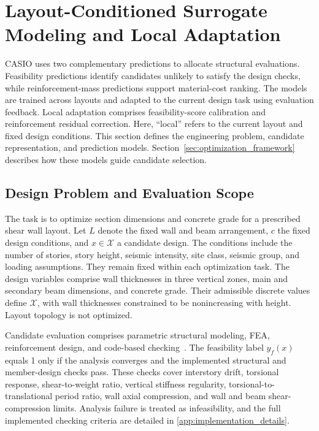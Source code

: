 \section{Layout-Conditioned Surrogate Modeling and Local Adaptation}
\label{sec:problem_surrogate}

CASIO uses two complementary predictions to allocate structural evaluations. Feasibility predictions identify candidates unlikely to satisfy the design checks, while reinforcement-mass predictions support material-cost ranking. The models are trained across layouts and adapted to the current design task using evaluation feedback. Local adaptation comprises feasibility-score calibration and reinforcement residual correction. Here, ``local'' refers to the current layout and fixed design conditions. This section defines the engineering problem, candidate representation, and prediction models. Section~\ref{sec:optimization_framework} describes how these models guide candidate selection.

\subsection{Design Problem and Evaluation Scope}
\label{subsec:expensive_problem}

The task is to optimize section dimensions and concrete grade for a prescribed shear wall layout. Let $L$ denote the fixed wall and beam arrangement, $c$ the fixed design conditions, and $x\in\mathcal{X}$ a candidate design. The conditions include the number of stories, story height, seismic intensity, site class, seismic group, and loading assumptions. They remain fixed within each optimization task. The design variables comprise wall thicknesses in three vertical zones, main and secondary beam dimensions, and concrete grade. Their admissible discrete values define $\mathcal{X}$, with wall thicknesses constrained to be nonincreasing with height. Layout topology is not optimized.

Candidate evaluation comprises parametric structural modeling, FEA, reinforcement design, and code-based checking~\cite{GB500112010,GB500102010}. The feasibility label $y_f(x)$ equals 1 only if the analysis converges and the implemented structural and member-design checks pass. These checks cover interstory drift, torsional response, shear-to-weight ratio, vertical stiffness regularity, torsional-to-translational period ratio, wall axial compression, and wall and beam shear-compression limits. Analysis failure is treated as infeasibility, and the full implemented checking criteria are detailed in \ref{app:implementation_details}.

